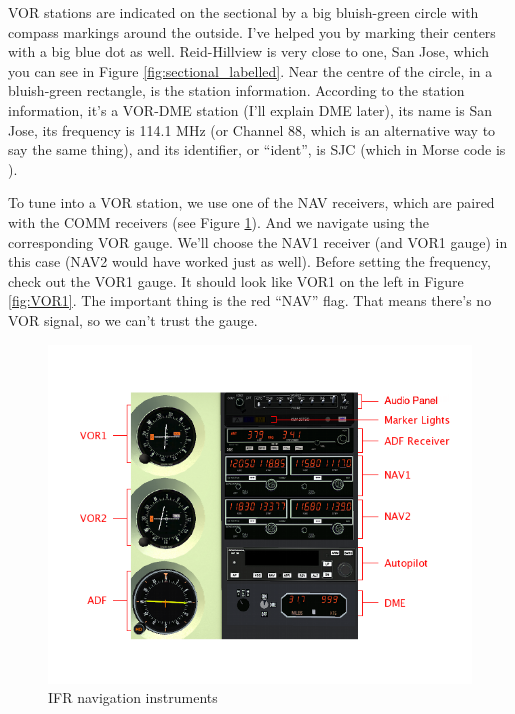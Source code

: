 VOR stations are indicated on the sectional by a big bluish-green
circle with compass markings around the outside.  I've helped you by
marking their centers with a big blue dot as well.  Reid-Hillview is
very close to one, San Jose, which you can see in Figure
\ref{fig:sectional_labelled}.  Near the centre of the circle, in a
bluish-green rectangle, is the station information.  According to the
station information, it's a VOR-DME station (I'll explain DME later),
its name is San Jose, its frequency is 114.1 MHz (or Channel 88, which
is an alternative way to say the same thing), and its identifier, or
``ident'', is SJC (which in Morse code is \mdot\mdot\mdot\mspace
\mdot\mdash\mdash\mdash\mspace \mdash\mdot\mdash\mdot).


To tune into a VOR station, we use one of the NAV receivers, which are
paired with the COMM receivers (see Figure \ref{fig:panel}).  And we
navigate using the corresponding VOR gauge.  We'll choose the NAV1
receiver (and VOR1 gauge) in this case (NAV2 would have worked just as
well).  Before setting the frequency, check out the VOR1 gauge.  It
should look like VOR1 on the left in Figure \ref{fig:VOR1}.  The
important thing is the red ``NAV'' flag.  That means there's no VOR
signal, so we can't trust the gauge.

\begin{figure}
  \begin{center}
    \includegraphics[width=12cm]{img/panel_labelled}
    \caption{IFR navigation instruments}
    \label{fig:panel}
  \end{center}
\end{figure}

